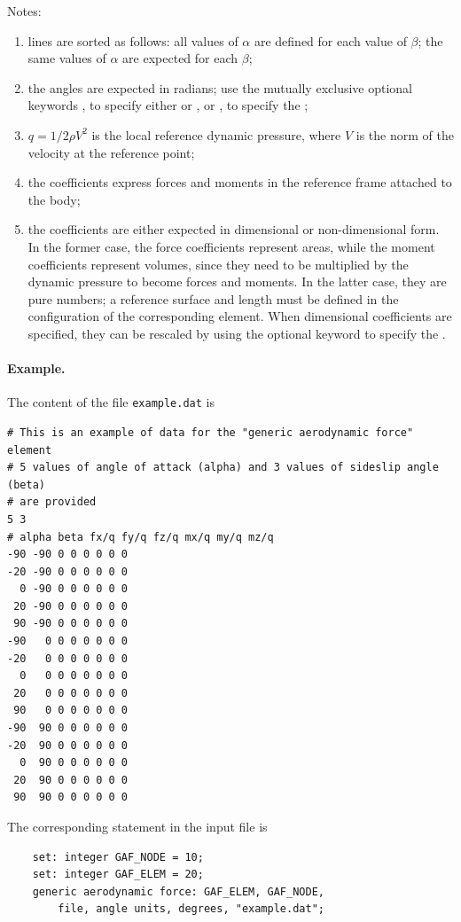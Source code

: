 Notes:
\begin{enumerate}
\item lines are sorted as follows:
all values of $\alpha$ are defined for each value of $\beta$;
the same values of $\alpha$ are expected for each $\beta$;
\item the angles are expected in radians;
use the mutually exclusive optional keywords ,
to specify either  or ,
or , to specify the ;
\item $q=1/2 \rho V^2$ is the local reference dynamic pressure,
where $V$ is the norm of the velocity at the reference point;
\item the coefficients express forces and moments in the reference frame
attached to the body;
\item the coefficients are either expected in dimensional
or non-dimensional form.
In the former case, the force coefficients represent areas,
while the moment coefficients represent volumes, since they need
to be multiplied by the dynamic pressure to become forces and moments.
In the latter case, they are pure numbers;
a reference surface and length must be defined in the configuration
of the corresponding  element.
When dimensional coefficients are specified, they can be rescaled
by using the optional keyword  to specify
the .
\end{enumerate}

\paragraph{Example.}
The content of the file \texttt{example.dat} is
\begin{verbatim}
# This is an example of data for the "generic aerodynamic force" element
# 5 values of angle of attack (alpha) and 3 values of sideslip angle (beta)
# are provided
5 3
# alpha beta fx/q fy/q fz/q mx/q my/q mz/q
-90 -90 0 0 0 0 0 0
-20 -90 0 0 0 0 0 0
  0 -90 0 0 0 0 0 0
 20 -90 0 0 0 0 0 0
 90 -90 0 0 0 0 0 0
-90   0 0 0 0 0 0 0
-20   0 0 0 0 0 0 0
  0   0 0 0 0 0 0 0
 20   0 0 0 0 0 0 0
 90   0 0 0 0 0 0 0
-90  90 0 0 0 0 0 0
-20  90 0 0 0 0 0 0
  0  90 0 0 0 0 0 0
 20  90 0 0 0 0 0 0
 90  90 0 0 0 0 0 0
\end{verbatim}
The corresponding statement in the input file is
\begin{verbatim}
    set: integer GAF_NODE = 10;
    set: integer GAF_ELEM = 20;
    generic aerodynamic force: GAF_ELEM, GAF_NODE,
        file, angle units, degrees, "example.dat";
\end{verbatim}



